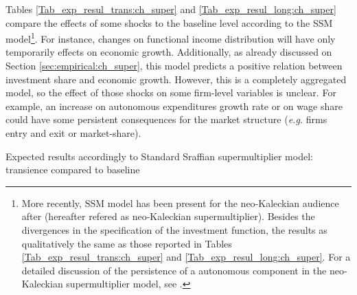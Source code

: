 \documentclass{SelfArx}
\begin{document}
Tables \ref{Tab_exp_resul_trans:ch_super} and \ref{Tab_exp_resul_long:ch_super} compare the effects of some shocks to the baseline level according to the SSM model\footnote{More recently, SSM model has been present for the neo-Kaleckian audience after \textcite{allain_2015_Tacklinga,lavoie_2016_Convergenceb} (hereafter refered as neo-Kaleckian supermultiplier). Besides the divergences in the specification of the investment function, the results as qualitatively the same as those reported in Tables \ref{Tab_exp_resul_trans:ch_super} and \ref{Tab_exp_resul_long:ch_super}. For a detailed discussion of the persistence of a autonomous component in the neo-Kaleckian supermultiplier model, see \cite{fagundes_2017_Role}.}.
For instance, changes on functional income distribution will have only temporarily effects on economic growth.
Additionally, as already discussed on Section \ref{sec:empirical:ch_super}, this model predicts a positive relation between investment share and economic growth.
However, this is a completely aggregated model, so the effect of those shocks on some firm-level variables is unclear.
For example, an increase on autonomous expenditures growth rate or on wage share could have some persistent consequences for the market structure (\emph{e.g.} firms entry and exit or market-share).



\begin{table*}\centering
\caption{Expected results accordingly to Standard Sraffian supermultiplier model: transience compared to baseline}
\label{Tab_exp_resul_trans:ch_super}
\caption*{\textbf{Source:} Authors' elaboration}
\end{table*}
\end{document}
